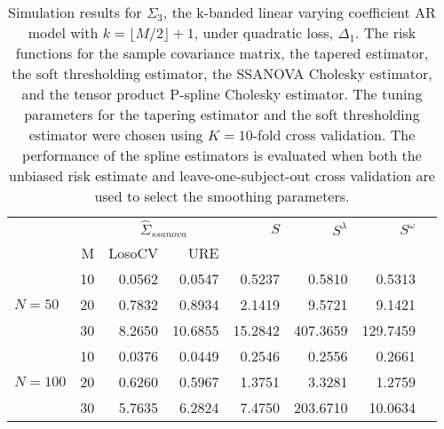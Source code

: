 \documentclass[12pt]{article}
\theoremstyle{definition}
\begin{document}
\begin{table}[H]
\centering
\caption{Simulation results for $\Sigma_3$, the k-banded linear varying coefficient AR model with $k = \lfloor M/2\rfloor + 1$, under quadratic loss, $\Delta_1$. The risk functions for the sample covariance matrix, the tapered estimator, the soft thresholding estimator, the SSANOVA Cholesky estimator, and the tensor product P-spline Cholesky estimator. The tuning parameters for the tapering estimator and the soft thresholding estimator were chosen using $K = 10$-fold cross validation. The performance of the spline estimators is evaluated when both the unbiased risk estimate and leave-one-subject-out cross validation are used to select the smoothing parameters.}
\begin{tabular}{l|r|rrrrrr}
&  & \multicolumn{2}{c}{$\hat{\Sigma}_{ssanova}$} & $S$ & $S^\lambda$ & $S^\omega$ \\ 
&M & \mbox{LosoCV} & \mbox{URE} &  \\ 
  \hline
 	          &    10 & 0.0562 &	0.0547 & 0.5237 & 0.5810 & 0.5313 \\ 
 $N = 50$ 	 &     20 & 0.7832 & 0.8934   & 2.1419 & 9.5721 & 9.1421\\ 
  		  &    30 & 8.2650 & 10.6855  & 15.2842 & 407.3659 & 129.7459\\ \hdashline
		  &    10 & 0.0376 &0.0449	 & 0.2546  & 0.2556 & 0.2661\\ 
 $N = 100$  &    20 & 0.6260 & 0.5967	 & 1.3751 & 3.3281 & 1.2759\\ 
   &    30 & 5.7635 &	6.2824 & 7.4750& 203.6710 & 10.0634 \\ 
\end{tabular}
\end{table}

\end{document}
